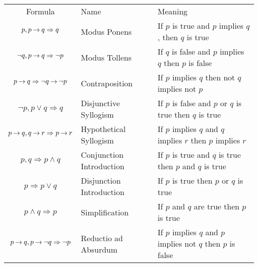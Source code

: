 \medskip
\begin{tabular}{c l l}
\label{Tab:RulesOfInference}
  Formula          & Name                  & Meaning      \\
  
  $p, p \mathbin{\rightarrow} q \Rightarrow q$                                  & 
  Modus Ponens                                                  & 
  If $p$ is true and $p$ implies $q$, then $q$ is true          \\   
  
  $\neg q, p \mathbin{\rightarrow} q \Rightarrow \neg p$                        & 
  Modus Tollens                                                 & 
  If $q$ is false and $p$ implies $q$ then $p$ is false         \\     
  
  $p \mathbin{\rightarrow} q \Rightarrow \neg q \mathbin{\rightarrow} \neg p$                   & 
  Contraposition                                                & 
  If $p$ implies $q$ then not $q$ implies not $p$               \\   
  
  $\neg p, p \vee q \Rightarrow q$                              & 
  Disjunctive Syllogism                                         & 
  If $p$ is false and $p$ or $q$ is true then $q$ is true       \\ 
  
  $p \mathbin{\rightarrow} q,  q \mathbin{\rightarrow} r \Rightarrow p \mathbin{\rightarrow} r$                 & 
  Hypothetical Syllogism                                        & 
  If $p$ implies $q$ and $q$ implies $r$ then $p$ implies $r$   \\   
  
  $p,q \Rightarrow p \wedge q$                                  & 
  Conjunction Introduction                                      & 
  If $p$ is true and $q$ is true then $p$ and $q$ is true       \\ 
  
  $p \Rightarrow p \vee q$                                      & 
  Disjunction Introduction                                      & 
  If $p$ is true then $p$ or $q$ is true                        \\    
  
  $p \wedge q \Rightarrow p$                                    & 
  Simplification                                                & 
  If $p$ and $q$ are true then $p$ is true                      \\    
  
  $p \mathbin{\rightarrow} q, p \mathbin{\rightarrow} \neg q \Rightarrow \neg p$                & 
  Reductio ad Absurdum                                          & 
  If $p$ implies $q$ and $p$ implies not $q$ then $p$ is false  \\ 
  

\end{tabular}
